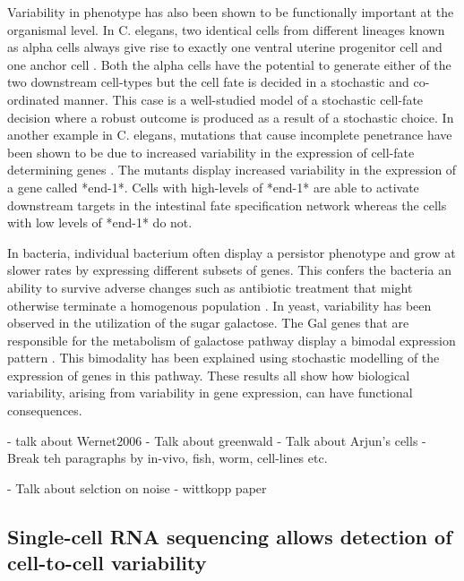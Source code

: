 Variability in phenotype has also been shown to be functionally important at the organismal level. In C. elegans, two identical cells from different lineages known as alpha cells always give rise to exactly one ventral uterine progenitor cell and one anchor cell \cite{seydoux_cell_1989}. Both the alpha cells have the potential to generate either of the two downstream cell-types but the cell fate is decided in a stochastic and co-ordinated manner. This case is a well-studied model of a stochastic cell-fate decision where a robust outcome is produced as a result of a stochastic choice. In another example in C. elegans, mutations that cause incomplete penetrance have been shown to be due to increased variability in the expression of cell-fate determining genes  \cite{raj_variability_2010}.  The mutants display increased variability in the expression of a gene called *end-1*. Cells with high-levels of *end-1* are able to activate downstream targets in the intestinal fate specification network whereas the cells with low levels of *end-1* do not. 

In bacteria, individual bacterium often display a persistor phenotype and grow at slower rates by expressing different subsets of genes. This confers the bacteria an ability to survive adverse changes such as antibiotic treatment that might otherwise terminate a homogenous population \cite{veening_bet-hedging_2008}. In yeast, variability has been observed in the utilization of the sugar galactose. The Gal genes that are responsible for the metabolism of galactose pathway display a bimodal expression pattern \cite{acar_enhancement_2005}. This bimodality has been explained using stochastic modelling of the expression of genes in this pathway. These results all show how biological variability, arising from variability in gene expression, can have functional consequences. 

- talk about Wernet2006
- Talk about greenwald
- Talk about Arjun's cells
- Break teh paragraphs by in-vivo, fish, worm, cell-lines etc.

- Talk about selction on noise
- wittkopp paper

\subsection{Single-cell RNA sequencing allows detection of cell-to-cell variability }

